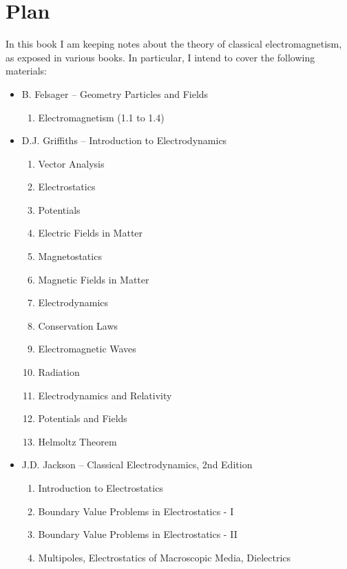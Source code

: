\chapter*{Plan}
\label{plan} 

In this book I am keeping notes about the theory of classical electromagnetism, 
as exposed in various books. In particular, I intend to cover the following materials:

\begin{itemize}

\item B. Felsager -- Geometry Particles and Fields
\begin{enumerate}
\setcounter{enumi}{0}
\item Electromagnetism (1.1 to 1.4)
\end{enumerate}

\item D.J. Griffiths -- Introduction to Electrodynamics
\begin{enumerate}
\setcounter{enumi}{0}
\item Vector Analysis
\item Electrostatics
\item Potentials
\item Electric Fields in Matter
\item Magnetostatics
\item Magnetic Fields in Matter
\item Electrodynamics
\item Conservation Laws
\item Electromagnetic Waves
\item Radiation
\item Electrodynamics and Relativity
\item Potentials and Fields
\item Helmoltz Theorem
\end{enumerate}

\item J.D. Jackson -- Classical Electrodynamics, 2nd Edition
\begin{enumerate}
\setcounter{enumi}{0}
\item Introduction to Electrostatics
\item Boundary Value Problems in Electrostatics - I
\item Boundary Value Problems in Electrostatics - II
\item Multipoles, Electrostatics of Macroscopic Media, Dielectrics
\end{enumerate}


\end{itemize}

